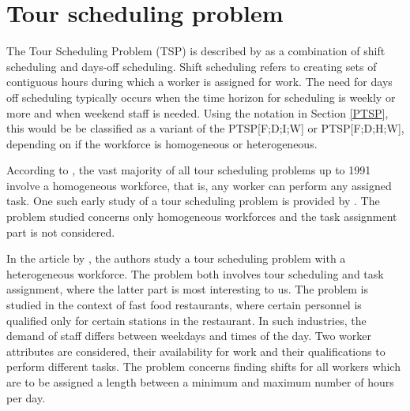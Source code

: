 
 

%
%
%
%


\section{Tour scheduling problem}\label{TSP}

The Tour Scheduling Problem (TSP) is described by \citet{loucks_1991} as a combination of shift scheduling and days-off scheduling. Shift scheduling refers to creating sets of contiguous hours during which a worker is assigned for work. The need for days off scheduling typically occurs when the time horizon for scheduling is weekly or more and when weekend staff is needed. Using the notation in Section \ref{PTSP}, this would be be classified as a variant of the PTSP[F;D;I;W] or PTSP[F;D;H;W], depending on if the workforce is homogeneous or heterogeneous.

According to \citet{loucks_1991}, the vast majority of all tour scheduling problems up to 1991 involve a homogeneous workforce, that is, any worker can perform any assigned task. One such early study of a tour scheduling problem is provided by \citet{thompson_1988}. The problem studied concerns only homogeneous workforces and the task assignment part is not considered.

In the article by \citet{loucks_1991}, the authors study a tour scheduling problem with a heterogeneous workforce. The problem both involves tour scheduling and task assignment, where the latter part is most interesting to us. The problem is studied in the context of fast food restaurants, where certain personnel is qualified only for certain stations in the restaurant. In such industries, the demand of staff differs between weekdays and times of the day. Two worker attributes are considered, their availability for work and their qualifications to perform different tasks. The problem concerns finding shifts for all workers which are to be assigned a length between a minimum and maximum number of hours per day.

